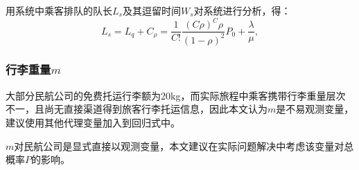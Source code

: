 用系统中乘客排队的队长$L_s$及其逗留时间$W_s$对系统进行分析，得：
\begin{equation}\label{eq:排队系统乘客队长-1}
    L_s = L_q + C_\rho = \frac{1}{C!}\frac{(C\rho)^C\rho}{(1-\rho)^2}P_0 + \frac{\lambda}{\mu},
\end{equation}

\subsubsection{行李重量$m$}
大部分民航公司的免费托运行李额为20kg，而实际旅程中乘客携带行李重量层次不一，且尚无直接渠道得到旅客行李托运信息，因此本文认为$m$是不易观测变量，建议使用其他代理变量加入到回归式中。

$m$对民航公司是显式直接以观测变量，本文建议在实际问题解决中考虑该变量对总概率$P$的影响。


